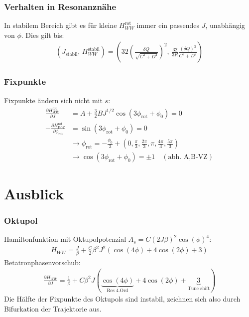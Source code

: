 \documentclass[hyperref={pdfpagelabels=false}]{beamer}
\begin{document}
\begin{frame}
 \frametitle{Verhalten in Resonanznähe}
 \pause
 In stabilem Bereich gibt es für kleine $H_{WW}^\text{rot}$ immer ein passendes $J$, unabhängig von $\phi$. Dies gilt bis:
 \begin{align*}
  (J_\text{stabil},\,H_{WW}^\text{stabil}) = \left(32\left(\frac{\delta Q}{\sqrt{C^2+D^2}}\right)^2,\, \frac{32}{3R}\frac{(\delta Q)^3}{C^2+D^2}\right)
 \end{align*}

\end{frame}

\begin{frame}
 \frametitle{Fixpunkte}
 \pause
 Fixpunkte ändern sich nicht mit $s$:
 \begin{align*}
  \frac{\partial H_{WW}^\text{rot}}{\partial J} &= A + \frac32 BJ^{1/2}\cos(3\phi_\text{rot} + \phi_0) = 0\\
  -\frac{\partial H_{WW}^\text{rot}}{\partial \phi_\text{rot}} &= \sin(3\phi_\text{rot} + \phi_0) = 0\\
  &\rightarrow \phi_\text{rot} = -\frac{\phi_0}{3}+\left(0,\frac{\pi}{3}, \frac{2\pi}{3}, \pi, \frac{4\pi}{3}, \frac{5\pi}{3}\right)\\
  &\rightarrow \cos(3\phi_\text{rot} + \phi_0) = \pm 1 \quad(\text{abh. A,B-VZ})
 \end{align*}
 

\end{frame}

\section{Ausblick}
\begin{frame}
 \frametitle{Oktupol}
 \pause
 Hamiltonfunktion mit Oktupolpotenzial $A_s = C(2J\beta)^2 \cos(\phi)^4$:
 \begin{align*}
  H_{WW} = \frac{J}{\beta}+ \frac{C}{2}\beta^2J^2(\cos(4\phi)+4\cos(2\phi)+3)
 \end{align*}
 Betatronphasenvorschub:
 \begin{align*}
  \frac{\partial H_{WW}}{\partial J }= \frac{1}{\beta} + C \beta^2J(\underbrace{\cos(4\phi)}_{\text{Res 4.Ord}}+4\cos(2\phi)+\underbrace{3}_{\text{Tune shift}})
 \end{align*}
Die Hälfte der Fixpunkte des Oktupols sind instabil, zeichnen sich also durch Bifurkation der Trajektorie aus.
 
\end{frame}
\end{document}
